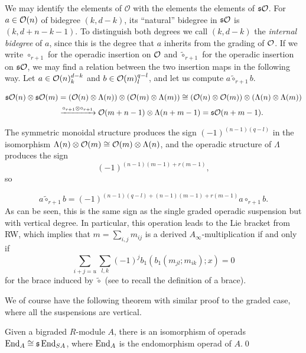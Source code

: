 \documentclass[twoside]{article}
\begin{document}
We may identify the elements of $\mathcal{O}$ with the elements the elements of $\mathfrak{s}{\mathcal O}$. For $a\in{\mathcal O}(n)$ of bidegree $(k,d-k)$, its ``natural'' bidegree in $\mathfrak{s}{\mathcal O}$ is $(k,d+n-k-1)$. To distinguish both degrees we call $(k,d-k)$ the \emph{internal bidegree} of $a$, since this is the degree that $a$ inherits from the grading of ${\mathcal O}$. If we write $\circ_{r+1}$ for the operadic insertion on ${\mathcal O}$ and $\tilde{\circ}_{r+1}$ for the operadic insertion on $\mathfrak{s}{\mathcal O}$, we may find a relation between the two insertion maps in the following way. Let $a\in{\mathcal O}(n)^{d-k}_k$ and $b\in{\mathcal O}(m)^{q-l}_l$, and let us compute $a\tilde{\circ}_{r+1} b$.

\begin{align*}
\mathfrak{s}{\mathcal O}(n)\otimes\mathfrak{s}{\mathcal O}(m)&=({\mathcal O}(n)\otimes\Lambda(n))\otimes ({\mathcal O}(m)\otimes\Lambda(m))\cong ({\mathcal O}(n)\otimes {\mathcal O}(m))\otimes (\Lambda(n)\otimes \Lambda(m))\\
&\xrightarrow{\circ_{r+1}\otimes\circ_{r+1}} {\mathcal O}(m+n-1)\otimes \Lambda(n+m-1)=\mathfrak{s}{\mathcal O}(n+m-1).
\end{align*}

The symmetric monoidal structure produces the sign $(-1)^{(n-1)(q-l)}$ in the isomorphism $\Lambda(n)\otimes {\mathcal O}(m)\cong{\mathcal O}(m)\otimes\Lambda(n)$, and the operadic structure of $\Lambda$ produces the sign $$(-1)^{(n-1)(m-1)+r(m-1)},$$ so 

\begin{equation}\label{sign}
a\tilde{\circ}_{r+1}b=(-1)^{(n-1)(q-l)+(n-1)(m-1)+r(m-1)}a\circ_{r+1} b.
\end{equation}
As can be seen, this is the same sign as the single graded operadic suspension but with vertical degree. In particular, this operation leads to the Lie bracket from RW, which implies that $m=\sum_{i,j}m_{ij}$ is a derived $A_\infty$-multiplication if and only if
\begin{equation}\label{sharp}
\sum_{i+j=u}\sum_{l,k}(-1)^jb_1(b_1(m_{jl};m_{ik});x)=0
\end{equation}
for the brace induced by $\tilde{\circ}$ (see  to recall the definition of a brace).

We of course have the following theorem with similar proof to the graded case, where all the suspensions are vertical.
\begin{thm}\label{markl}
Given a bigraded $R$-module $A$, there is an isomorphism of operads $\operatorname{End}_{ A}\cong \mathfrak{s}\operatorname{End}_{SA}$, where $\operatorname{End}_A$ is the endomorphism operad of $A$.\qed
\end{thm}
\end{document}
